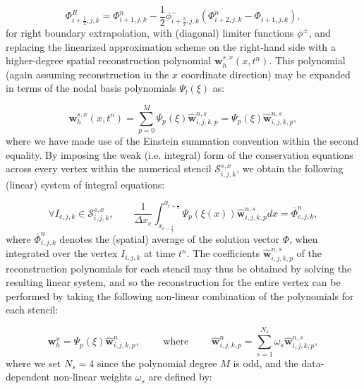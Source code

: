\documentclass{article}
\begin{document}
\begin{equation}
\Phi_{i + \frac{1}{2}, j, k}^{R} = \Phi_{i + 1, j, k}^{n} - \frac{1}{2} \phi_{i + \frac{3}{2}, j, k}^{-} \left( \Phi_{i + 2, j, k}^{n} - \Phi_{i + 1, j, k} \right),
\end{equation}
for right boundary extrapolation, with (diagonal) limiter functions ${\phi^{\pm}}$, and replacing the linearized approximation scheme on the right-hand side with a higher-degree spatial reconstruction polynomial ${\mathbf{w}_{h}^{s, x} \left( x, t^n \right)}$. This polynomial (again assuming reconstruction in the $x$ coordinate direction) may be expanded in terms of the nodal basis polynomials ${\Psi_{l} \left( \xi \right)}$ as:

\begin{equation}
\mathbf{w}_{h}^{s, x} \left( x, t^n \right) = \sum_{p = 0}^{M} \Psi_{p} \left( \xi \right) \hat{\mathbf{w}}_{i, j, k, p}^{n, s} = \Psi_{p} \left( \xi \right) \hat{\mathbf{w}}_{i, j, k, p}^{n, s},
\end{equation}
where we have made use of the Einstein summation convention within the second equality. By imposing the weak (i.e. integral) form of the conservation equations across every vertex within the numerical stencil ${\mathcal{S}_{i, j, k}^{s, x}}$, we obtain the following (linear) system of integral equations:

\begin{equation}
\forall I_{e, j, k} \in \mathcal{S}_{i, j, k}^{s, x}, \qquad \frac{1}{\Delta x_e} \int_{x_{e - \frac{1}{2}}}^{x_{e + \frac{1}{2}}} \Psi_{p} \left( \xi \left( x \right) \right) \hat{\mathbf{w}}_{i, j, k, p}^{n, s} dx = \bar{\Phi}_{e, j, k}^{n},
\end{equation}
where ${\bar{\Phi}_{i, j, k}^{n}}$ denotes the (spatial) average of the solution vector ${\Phi}$, when integrated over the vertex ${I_{i, j, k}}$ at time ${t^n}$. The coefficients ${\hat{\mathbf{w}}_{i, j, k, p}^{n, s}}$ of the reconstruction polynomials for each stencil may thus be obtained by solving the resulting linear system, and so the reconstruction for the entire vertex can be performed by taking the following non-linear combination of the polynomials for each stencil:

\begin{equation}
\mathbf{w}_{h}^{x} = \Psi_{p} \left( \xi \right) \hat{\mathbf{w}}_{i, j, k, p}^{n}, \qquad \text{ where } \qquad \hat{\mathbf{w}}_{i, j, k, p}^{n} = \sum_{s = 1}^{N_s} \omega_s \hat{\mathbf{w}}_{i, j, k, p}^{n, s},
\end{equation}
where we set ${N_s = 4}$ since the polynomial degree $M$ is odd, and the data-dependent non-linear weights ${\omega_s}$ are defined by:
\end{document}
